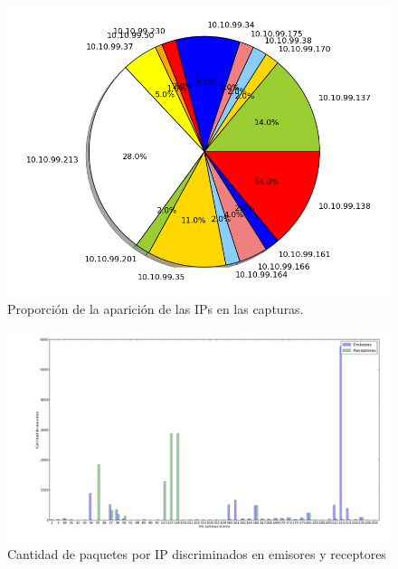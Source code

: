 \begin{figure}[!h]
  \includegraphics[width=\textwidth,keepaspectratio]{graph/torta-invgate.png}
  \caption{Proporción de la aparición de las IPs en las capturas.}
  \label{fig:torta-inv}
\end{figure}

\begin{figure}[!h]
  \includegraphics[width=\textwidth,keepaspectratio]{graph/barras-invgate.png}
  \caption{Cantidad de paquetes por IP discriminados en emisores y receptores}
  \label{fig:barras-inv}
\end{figure}

